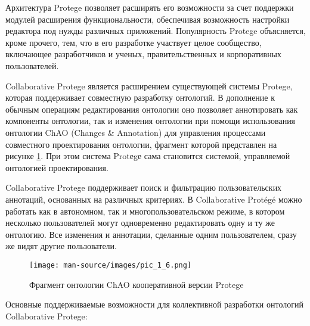 Архитектура Protege позволяет расширять его возможности за счет поддержки модулей расширения функциональности, обеспечивая возможность настройки редактора под нужды различных приложений. Популярность Protege объясняется, кроме прочего, тем, что в его разработке участвует целое сообщество, включающее разработчиков и ученых, правительственных и корпоративных пользователей.

Collaborative Protege является расширением существующей системы Protege, которая поддерживает совместную разработку онтологий. В дополнение к обычным операциям редактирования онтологии оно позволяет аннотировать как компоненты онтологии, так и изменения онтологии при помощи использования онтологии ChAO (Changes \& Annotation) для управления процессами совместного проектирования онтологии, фрагмент которой представлен на рисунке \ref{pic_1.6}. При этом система Protеgе сама становится системой, управляемой онтологией проектирования.

Collaborative Protege поддерживает поиск и фильтрацию пользовательских аннотаций, основанных на различных критериях. В Collaborative Protégé можно работать как в автономном, так и многопользовательском режиме, в котором несколько пользователей могут одновременно редактировать одну и ту же онтологию. Все изменения и аннотации, сделанные одним пользователем, сразу же видят другие пользователи.

\begin{figure}[H]
\begin{center}
\texttt{[image: man-source/images/pic\_1\_6.png]}\\[2mm]
\caption{Фрагмент онтологии ChAO кооперативной версии Protege}\label{pic_1.6}
\end{center}
\end{figure}

Основные поддерживаемые возможности для коллективной разработки онтологий Collaborative Protege:

